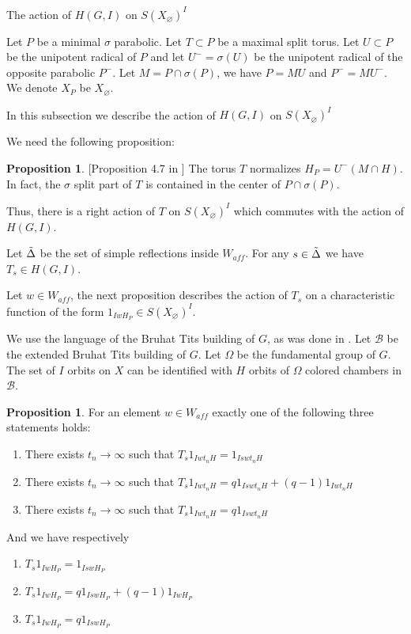 \documentclass[12pt]{article}
\newcommand{\B}{\mathcal{B}}
\newcommand{\<}{\langle}
\renewcommand{\>}{\rangle}
\renewcommand{\emptyset}{\varnothing}
\theoremstyle{plain}
\theoremstyle{definition}
\newtheorem{prop}[theorem]{Proposition}
\begin{document}
\begin{subsection}{The action of $H(G,I)$ on $S(X_\emptyset)^I$}

Let $P$ be a minimal $\sigma$ parabolic. Let $T\subset P$ be a maximal split torus. Let $U\subset P$ be the unipotent radical of $P$ and let $U^-=\sigma(U)$ be the unipotent radical of the opposite parabolic $P^-$. Let $M=P\cap \sigma(P)$, we have $P=MU$ and $P^-=MU^-$. We denote $X_P$ be $X_\emptyset$.

In this subsection we describe the action of $H(G,I)$ on $S(X_\emptyset)^I$


We need the following proposition:

\begin{prop}\label{normalizing}[Proposition 4.7 in \cite{Helminck}]
The torus $T$ normalizes $H_P=U^-(M\cap H).$ In fact, the $\sigma$ split part of $T$ is contained in the center of $P\cap \sigma(P).$
\end{prop}

Thus, there is a right action of $T$ on $S(X_\emptyset)^I$ which commutes with the action of $H(G,I)$.

Let $\Tilde{\Delta}$ be the set of simple reflections inside $W_{aff}$. For any $s\in \Tilde{\Delta}$ we have $T_s\in H(G,I)$.

Let $w\in W_{aff}$, the next proposition describes the action of $T_s$ on a characteristic function of the form $1_{IwH_P}\in S(X_\emptyset)^I$. 

We use the language of the Bruhat Tits building of $G$, as was done in \cite{my}. Let $\B$ be the extended Bruhat Tits building of $G$. Let $\Omega$ be the fundamental group of $G$. The set of $I$ orbits on $X$ can be identified with $H$ orbits of $\Omega$ colored chambers in $\B$. 

\begin{prop}\label{action}
For an element $w\in W_{aff}$ exactly one of the following three statements holds:
\begin{enumerate}
    \item There exists $t_n\rightarrow\infty$ such that $T_s1_{Iwt_nH}=1_{Iswt_nH}$
    \item There exists $t_n\rightarrow\infty$ such that $T_s1_{Iwt_nH}=q1_{Iswt_nH}+(q-1)1_{Iwt_nH}$
    \item There exists $t_n\rightarrow\infty$ such that $T_s1_{Iwt_nH}=q1_{Iswt_nH}$
\end{enumerate}
And we have respectively
\begin{enumerate}
    \item $T_s1_{IwH_P}=1_{IswH_P}$
    \item $T_s1_{IwH_P}=q1_{IswH_P}+(q-1)1_{IwH_P}$
    \item $T_s1_{IwH_P}=q1_{IswH_P}$
\end{enumerate}
\end{prop}


\end{subsection}
\end{document}
